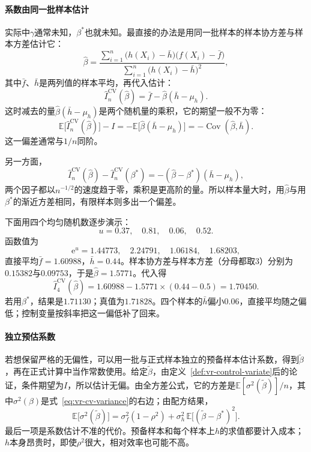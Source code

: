 \paragraph{系数由同一批样本估计}
实际中$\gamma$通常未知，$\beta^{*}$也就未知。最直接的办法是用同一批样本的样本协方差与样本方差估计它：
\begin{equation}
 \hat{\beta}=\frac{\sum_{i=1}^{n}\bigl(h(X_i)-\bar{h}\bigr)\bigl(f(X_i)-\bar{f}\bigr)}{\sum_{i=1}^{n}\bigl(h(X_i)-\bar{h}\bigr)^2} ,
 \label{eq:vr-cv-beta-hat}
\end{equation}
其中$\bar{f}$、$\bar{h}$是两列值的样本平均，再代入估计：
\[
 \hat{I}_n^{\mathrm{CV}}(\hat{\beta})=\bar{f}-\hat{\beta}(\bar{h}-\mu_h) .
\]这时减去的量$\hat{\beta}(\bar{h}-\mu_h)$是两个随机量的乘积，它的期望一般不为零：
\[
 \mathbb{E}\bigl[\hat{I}_n^{\mathrm{CV}}(\hat{\beta})\bigr]-I=-\mathbb{E}\bigl[\hat{\beta}(\bar{h}-\mu_h)\bigr]=-\operatorname{Cov}(\hat{\beta},\bar{h}) .
\]
这一偏差通常与$1/n$同阶。

另一方面，
\[
 \hat{I}_n^{\mathrm{CV}}(\hat{\beta})-\hat{I}_n^{\mathrm{CV}}(\beta^{*})=-(\hat{\beta}-\beta^{*})(\bar{h}-\mu_h) ,
\]
两个因子都以$n^{-1/2}$的速度趋于零，乘积是更高阶的量。所以样本量大时，用$\hat{\beta}$与用$\beta^{*}$的渐近方差相同，有限样本则多出一个偏差。

下面用四个均匀随机数逐步演示：
\[
 u=0.37,\quad 0.81,\quad 0.06,\quad 0.52 .
\]
函数值为
\[
 \mathrm{e}^{u}=1.44773,\quad 2.24791,\quad 1.06184,\quad 1.68203 ,
\]
直接平均$\bar{f}=1.60988$，$\bar{h}=0.44$。样本协方差与样本方差（分母都取$3$）分别为$0.15382$与$0.09753$，于是$\hat{\beta}=1.5771$。代入得
\[
 \hat{I}_4^{\mathrm{CV}}(\hat{\beta})=1.60988-1.5771\times(0.44-0.5)=1.70450 .
\]
若用$\beta^{*}$，结果是$1.71130$；真值为$1.71828$。四个样本的$\bar{h}$偏小$0.06$，直接平均随之偏低；控制变量按斜率把这一偏低补了回来。

\paragraph{独立预估系数}
若想保留严格的无偏性，可以用一批与正式样本独立的预备样本估计系数，得到$\widetilde{\beta}$，再在正式计算中当作常数使用。给定$\widetilde{\beta}$，由定义~\ref{def:vr-control-variate}后的论证，条件期望为$I$，所以估计无偏。由全方差公式，它的方差是$\mathbb{E}[\sigma^2(\widetilde{\beta})]/n$，其中$\sigma^2(\beta)$是式~\eqref{eq:vr-cv-variance}的右边；由配方结果，
\[
 \mathbb{E}\bigl[\sigma^2(\widetilde{\beta})\bigr]=\sigma_f^2(1-\rho^2)+\sigma_h^2\,\mathbb{E}\bigl[(\widetilde{\beta}-\beta^{*})^2\bigr] .
\]
最后一项是系数估计不准的代价。预备样本和每个样本上$h$的求值都要计入成本；$h$本身昂贵时，即使$\rho^2$很大，相对效率也可能不高。

